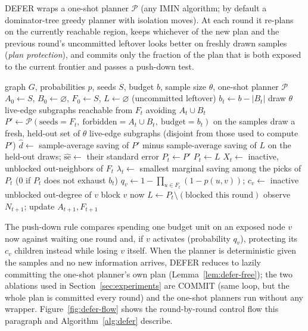 \documentclass[ASNA,number]{USG}
\begin{document}
DEFER wraps a one-shot planner $\mathcal P$ (any IMIN algorithm; by default
a dominator-tree greedy planner with isolation moves). At each round it
re-plans on the currently reachable region, keeps whichever of the new plan
and the previous round's uncommitted leftover looks better on freshly drawn
samples (\emph{plan protection}), and commits only the fraction of the plan
that is both exposed to the current frontier and passes a push-down test.

\begin{algorithm}[h]
\caption{DEFER}\label{alg:defer}
\begin{algorithmic}[1]
\Require graph $G$, probabilities $p$, seeds $S$, budget $b$, sample size
  $\theta$, one-shot planner $\mathcal P$
\State $A_0\gets S$, $B_0\gets\varnothing$, $F_0\gets S$, $L\gets\varnothing$ (uncommitted leftover)
  \State $b_t\gets b-|B_t|$
  \State draw $\theta$ live-edge subgraphs reachable from $F_t$ avoiding $A_t\cup B_t$
  \State $P'\gets\mathcal P(\text{seeds}=F_t,\ \text{forbidden}=A_t\cup B_t,\ \text{budget}=b_t)$ on the samples
  \State draw a fresh, held-out set of $\theta$ live-edge subgraphs (disjoint from those used to compute $P'$)
  \State $\hat d\gets$ sample-average saving of $P'$ minus sample-average saving of $L$ on the held-out draws; $\widehat{\mathrm{se}}\gets$ their standard error
   
    \State $P_t\gets P'$
  \Else
    \State $P_t\gets L$
  \EndIf
  \State $X_t\gets$ inactive, unblocked out-neighbors of $F_t$
  \State $\lambda_t\gets$ smallest marginal saving among the picks of $P_t$ (0 if $P_t$ does not exhaust $b_t$)
  \label{alg:pushdown-start}
    \State $q_v\gets 1-\prod_{u\in F_t}(1-p(u,v))$; $c_v\gets$ inactive unblocked out-degree of $v$
     
      \State block $v$ now
    \EndIf
  \EndFor\label{alg:pushdown-end}
  \State $L\gets P_t\setminus(\text{blocked this round})$
  \State observe $N_{t+1}$; update $A_{t+1},F_{t+1}$
\EndFor
\end{algorithmic}
\end{algorithm}

The push-down rule compares spending one budget unit on an exposed node $v$
now against waiting one round and, if $v$ activates (probability $q_v$),
protecting its $c_v$ children instead while losing $v$ itself. When the
planner is deterministic given the samples and no new information arrives,
DEFER reduces to lazily committing the one-shot planner's own plan
(Lemma~\ref{lem:defer-free}); the two ablations used in
Section~\ref{sec:experiments} are COMMIT (same loop, but the whole plan is
committed every round) and the one-shot planners run without any wrapper.
Figure~\ref{fig:defer-flow} shows the round-by-round control flow this
paragraph and Algorithm~\ref{alg:defer} describe.
\end{document}
